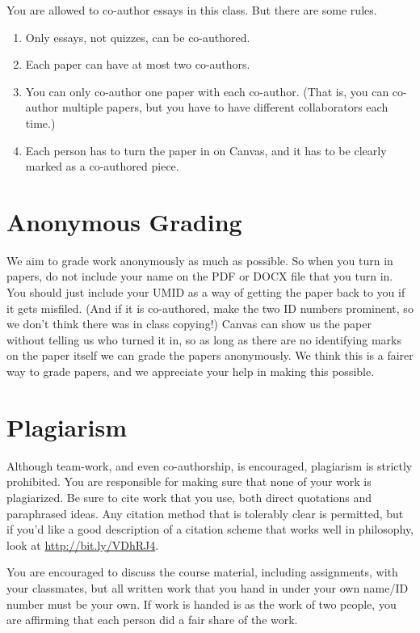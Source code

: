 \documentclass[
]{article}
\providecommand{\tightlist}{%
  \setlength{\itemsep}{0pt}\setlength{\parskip}{0pt}}\usepackage{longtable,booktabs,array}
\begin{document}
You are allowed to co-author essays in this class. But there are some
rules.

\begin{enumerate}
\def\labelenumi{\arabic{enumi}.}
\tightlist
\item
  Only essays, not quizzes, can be co-authored.
\item
  Each paper can have at most two co-authors.
\item
  You can only co-author one paper with each co-author. (That is, you
  can co-author multiple papers, but you have to have different
  collaborators each time.)
\item
  Each person has to turn the paper in on Canvas, and it has to be
  clearly marked as a co-authored piece.
\end{enumerate}

\hypertarget{anonymous-grading}{%
\section{Anonymous Grading}\label{anonymous-grading}}

We aim to grade work anonymously as much as possible. So when you turn
in papers, do not include your name on the PDF or DOCX file that you
turn in. You should just include your UMID as a way of getting the paper
back to you if it gets misfiled. (And if it is co-authored, make the two
ID numbers prominent, so we don't think there was in class copying!)
Canvas can show us the paper without telling us who turned it in, so as
long as there are no identifying marks on the paper itself we can grade
the papers anonymously. We think this is a fairer way to grade papers,
and we appreciate your help in making this possible.

\hypertarget{plagiarism}{%
\section{Plagiarism}\label{plagiarism}}

Although team-work, and even co-authorship, is encouraged, plagiarism is
strictly prohibited. You are responsible for making sure that none of
your work is plagiarized. Be sure to cite work that you use, both direct
quotations and paraphrased ideas. Any citation method that is tolerably
clear is permitted, but if you'd like a good description of a citation
scheme that works well in philosophy, look at
\url{http://bit.ly/VDhRJ4}.

You are encouraged to discuss the course material, including
assignments, with your classmates, but all written work that you hand in
under your own name/ID number must be your own. If work is handed is as
the work of two people, you are affirming that each person did a fair
share of the work.
\end{document}

